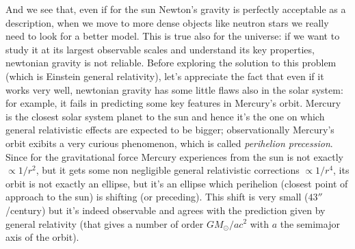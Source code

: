 \documentclass[11pt, a4paper,oneside,openright]{book}
\numberwithin{equation}{section}
\begin{document}
And we see that, even if for the sun Newton's gravity is perfectly acceptable as a description, when we move to more dense objects like neutron stars we really need to look for a better model. This is true also for the universe: if we want to study it at its largest observable scales and understand its key properties, newtonian gravity is not reliable. Before exploring the solution to this problem (which is Einstein general relativity), let's appreciate the fact that even if it works very well, newtonian gravity has some little flaws also in the solar system: for example, it fails in predicting some key features in Mercury's orbit. Mercury is the closest solar system planet to the sun and hence it's the one on which general relativistic effects are expected to be bigger; observationally Mercury's orbit exibits a very curious phenomenon, which is called \textit{perihelion precession}. Since for the gravitational force Mercury experiences from the sun is not exactly $\propto 1/r^2$, but it gets some non 
negligible general relativistic corrections $\propto 1/r^4$, its orbit is not exactly an ellipse, but it's an ellipse which perihelion (closest point of approach to the sun) is shifting (or preceding). This shift is very small ($43''$/century) but it's indeed observable and agrees with the prediction given by general relativity (that gives a number of order $GM_\odot/ac^2$ with $a$ the semimajor axis of the orbit).  
\end{document}
